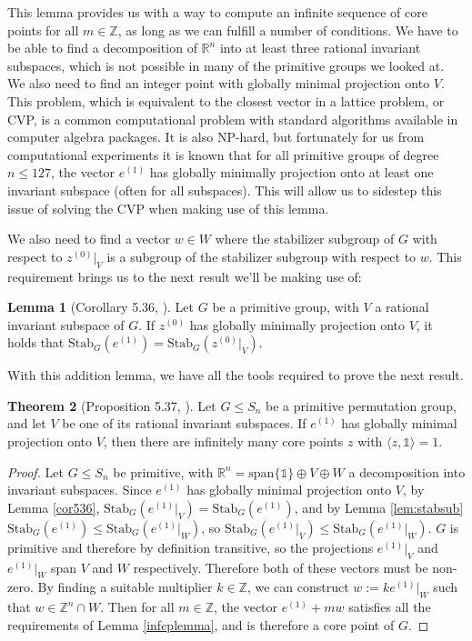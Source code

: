 \documentclass[11pt]{article} %
\theoremstyle{definition}
\newtheorem{theorem}{Theorem}[section]
\newtheorem{lemma}[theorem]{Lemma}
\theoremstyle{remark}
\newcommand{\ZZ}{\mathbb{Z}}
\newcommand{\RR}{\mathbb{R}}
\newcommand{\myspan}[1]{\textrm{span} \lbrace {#1} \rbrace}
\newcommand{\stab}[2]{\textrm{Stab}_{#1}({#2})}
\begin{document}
This lemma provides us with a way to compute an infinite sequence of core points for all $m \in \ZZ$, as long as we can fulfill a number of conditions. We have to be able to find a decomposition of $\RR^n$ into at least three rational invariant subspaces, which is not possible in many of the primitive groups we looked at. We also need to find an integer point with globally minimal projection onto $V$. This problem, which is equivalent to the closest vector in a lattice problem, or CVP, is a common computational problem with standard algorithms available in computer algebra packages. It is also NP-hard, but fortunately for us from computational experiments it is known that for all primitive groups of degree $n \leq 127$, the vector $e^{(1)}$ has globally minimally projection onto at least one invariant subspace (often for all subspaces). This will allow us to sidestep this issue of solving the CVP when making use of this lemma. 

We also need to find a vector $w \in W$ where the stabilizer subgroup of $G$ with respect to $z^{(0)}|_V$ is a subgroup of the stabilizer subgroup with respect to $w$. This requirement brings us to the next result we'll be making use of:

\begin{lemma}[Corollary 5.36, \cite{rehn}]
Let $G$ be a primitive group, with $V$ a rational invariant subspace of $G$. If $z^{(0)}$ has globally minimally projection onto $V$, it holds that $\stab{G}{e^{(1)}} = \stab{G}{z^{(0)}|_V}$.
\end{lemma}

With this addition lemma, we have all the tools required to prove the next result.

\begin{theorem}[Proposition 5.37, \cite{rehn}] \label{cor536}
Let $G \leq S_n$ be a primitive permutation group, and let $V$ be one of its rational invariant subspaces. If $e^{(1)}$ has globally minimal projection onto $V$, then there are infinitely many core points $z$ with $\langle z, \mathds{1} \rangle = 1$.
\end{theorem}

\begin{proof}
Let $G \leq S_n$ be primitive, with $\RR^n = \myspan{\mathds{1}} \oplus V \oplus W$ a decomposition into invariant subspaces. Since $e^{(1)}$ has globally minimal projection onto $V$, by Lemma \eqref{cor536}, $\stab{G}{e^{(1)}|_V} = \stab{G}{e^{(1)}}$, and by Lemma \eqref{lem:stabsub} $\stab{G}{e^{(1)}} \leq \stab{G}{e^{(1)}|_W}$, so $\stab{G}{e^{(1)}|_V} \leq \stab{G}{e^{(1)}|_W}$. $G$ is primitive and therefore by definition transitive, so the projections $e^{(1)}|_V$ and $e^{(1)}|_W$ span $V$ and $W$ respectively. Therefore both of these vectors must be non-zero. By finding a suitable multiplier $k \in \ZZ$, we can construct $w := ke^{(1)}|_W$ such that $w \in \ZZ^n \cap W$. Then for all $m \in \ZZ$, the vector $e^{(1)} + mw$ satisfies all the requirements of Lemma \eqref{infcplemma}, and is therefore a core point of $G$.
\end{proof}
\end{document}
